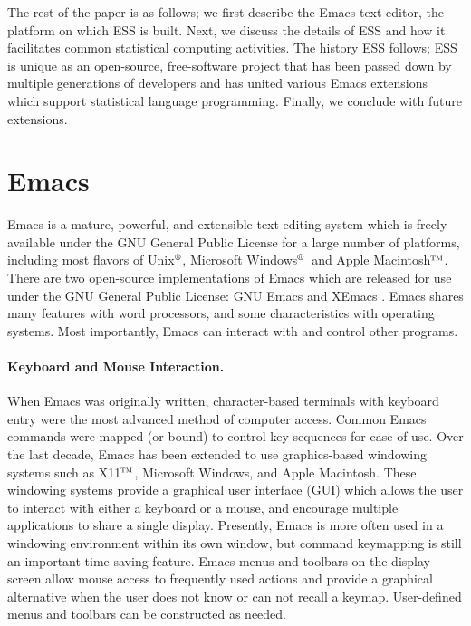 \documentclass{article}
\newcommand*{\regstrd}{$^{\mbox{\scriptsize{\textregistered}}}$}
\newcommand*{\tm}{$^{\mbox{\scriptsize\sc tm}}$}
\begin{document}
The rest of the paper is as follows; we first describe the Emacs text
editor, the platform on which ESS is built.  Next, we discuss the
details of ESS and how it facilitates common statistical computing
activities.  The history ESS follows; ESS is unique as an open-source,
free-software project that has been passed down by multiple
generations of developers and has united various Emacs extensions
which support statistical language programming.  Finally, we conclude
with future extensions.

\section{Emacs}
\label{sec:emacs}

Emacs is a mature, powerful, and extensible text editing system which
is freely available under the GNU General Public License for a large
number of platforms, including most flavors of Unix\regstrd, Microsoft
Windows\regstrd\ and Apple Macintosh\tm.  There are two open-source
implementations of Emacs which are released for use under the GNU
General Public License: GNU Emacs \citep{GNU-Emacs} and XEmacs
\citep{XEmacs}.  Emacs shares many features with word processors, and
some characteristics with operating systems.  Most importantly, Emacs
can interact with and control other programs.

\paragraph{Keyboard and Mouse Interaction.}
When Emacs was originally written, character-based terminals with
keyboard entry were the most advanced method of computer access.
Common Emacs commands were mapped (or bound) to control-key sequences
for ease of use.  Over the last decade, Emacs has been extended to use
graphics-based windowing systems such as X11\tm, Microsoft Windows,
and Apple Macintosh.  These windowing systems provide a graphical user
interface (GUI) which allows the user to interact with either a
keyboard or a mouse, and encourage multiple applications to share a
single display.  Presently, Emacs is more often used in a windowing
environment within its own window, but command keymapping is still an
important time-saving feature.  Emacs menus and toolbars on the
display screen allow mouse access to frequently used actions and
provide a graphical alternative when the user does not know or can not
recall a keymap.  User-defined menus and toolbars can be constructed
as needed.
\end{document}
